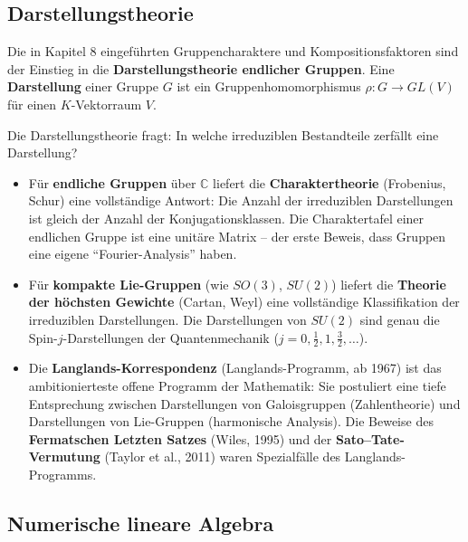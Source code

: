 ﻿\documentclass[a4paper,12pt]{report}
\theoremstyle{definition}
\begin{document}
\subsection*{Darstellungstheorie}

Die in Kapitel 8 eingeführten Gruppencharaktere und
Kompositionsfaktoren sind der Einstieg in die
\textbf{Darstellungstheorie endlicher Gruppen}.
Eine \textbf{Darstellung} einer Gruppe $G$ ist ein
Gruppenhomomorphismus $\rho : G \to GL(V)$ für einen
$K$-Vektorraum $V$.

Die Darstellungstheorie fragt: In welche irreduziblen
Bestandteile zerfällt eine Darstellung?
\begin{itemize}
    \item[-] Für \textbf{endliche Gruppen} über $\mathbb{C}$
          liefert die \textbf{Charaktertheorie} (Frobenius, Schur)
          eine vollständige Antwort: Die Anzahl der irreduziblen
          Darstellungen ist gleich der Anzahl der Konjugationsklassen.
          Die Charaktertafel einer endlichen Gruppe ist eine unitäre
          Matrix -- der erste Beweis, dass Gruppen eine eigene
          ``Fourier-Analysis'' haben.
    \item[-] Für \textbf{kompakte Lie-Gruppen} (wie $SO(3)$, $SU(2)$)
          liefert die \textbf{Theorie der höchsten Gewichte}
          (Cartan, Weyl) eine vollständige Klassifikation der
          irreduziblen Darstellungen. Die Darstellungen von $SU(2)$
          sind genau die Spin-$j$-Darstellungen der Quantenmechanik
          ($j = 0, \frac{1}{2}, 1, \frac{3}{2}, \ldots$).
    \item[-] Die \textbf{Langlands-Korrespondenz} (Langlands-Programm,
          ab 1967) ist das ambitionierteste offene Programm der
          Mathematik: Sie postuliert eine tiefe Entsprechung zwischen
          Darstellungen von Galoisgruppen (Zahlentheorie) und
          Darstellungen von Lie-Gruppen (harmonische Analysis).
          Die Beweise des \textbf{Fermatschen Letzten Satzes}
          (Wiles, 1995) und der \textbf{Sato--Tate-Vermutung}
          (Taylor et al., 2011) waren Spezialfälle des
          Langlands-Programms.
\end{itemize}

\subsection*{Numerische lineare Algebra}
\end{document}
